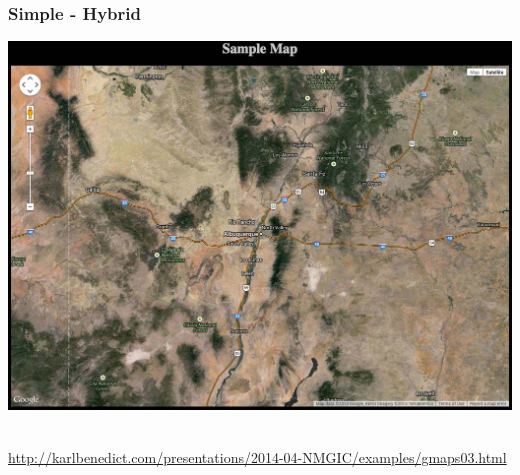 \documentclass[]{article}
\begin{document}
\subsubsection{Simple - Hybrid}\label{simple---hybrid}

\includegraphics{images/google_03.jpg}~

\url{http://karlbenedict.com/presentations/2014-04-NMGIC/examples/gmaps03.html}
\end{document}
